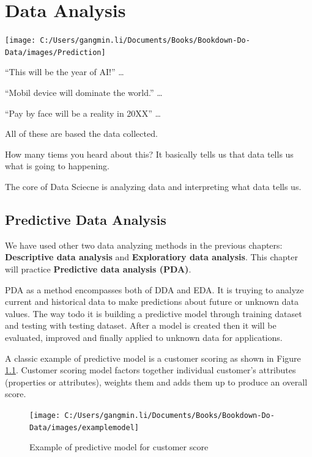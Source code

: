 \documentclass[
]{book}
\begin{document}
\hypertarget{data-analysis}{%
\chapter{Data Analysis}\label{data-analysis}}

\begin{center}\texttt{[image: C:/Users/gangmin.li/Documents/Books/Bookdown-Do-Data/images/Prediction]} \end{center}

``This will be the year of AI!'' \ldots{}

``Mobil device will dominate the world.'' \ldots{}

``Pay by face will be a reality in 20XX'' \ldots{}

All of these are based the data collected.

How many tiems you heard about this? It basically tells us that data tells us what is going to happening.

The core of Data Sciecne is analyzing data and interpreting what data tells us.

\hypertarget{predictive-data-analysis}{%
\section{Predictive Data Analysis}\label{predictive-data-analysis}}

We have used other two data analyzing methods in the previous chapters: \textbf{Descriptive data analysis} and \textbf{Exploratiory data analysis}. This chapter will practice \textbf{Predictive data analysis (PDA)}.

PDA as a method encompasses both of DDA and EDA. It is truying to analyze current and historical data to make predictions about future or unknown data values. The way todo it is building a predictive model through training dataset and testing with testing dataset. After a model is created then it will be evaluated, improved and finally applied to unknown data for applications.

A classic example of predictive model is a customer scoring as shown in Figure \ref{fig:modelexam}. Customer scoring model factors together individual customer's attributes (properties or attributes), weights them and adds them up to produce an overall score.

\begin{figure}

{\centering \texttt{[image: C:/Users/gangmin.li/Documents/Books/Bookdown-Do-Data/images/examplemodel]} 

}

\caption{Example of predictive model for customer score}\label{fig:modelexam}
\end{figure}
\end{document}
